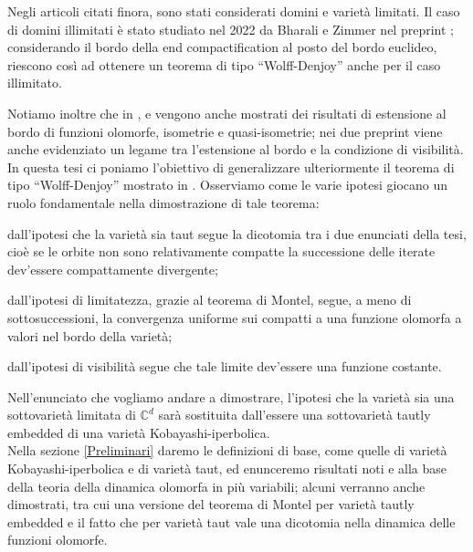 Negli articoli citati finora, sono stati considerati domini e varietà limitati. Il caso di domini illimitati è stato studiato nel 2022 da Bharali e Zimmer nel preprint \cite{BZ2}; considerando il bordo della end compactification al posto del bordo euclideo, riescono così ad ottenere un teorema di tipo ``Wolff-Denjoy'' anche per il caso illimitato.

Notiamo inoltre che in \cite{BZ1}, \cite{CMS} e \cite{BZ2} vengono anche mostrati dei risultati di estensione al bordo di funzioni olomorfe, isometrie e quasi-isometrie; nei due preprint viene anche evidenziato un legame tra l'estensione al bordo e la condizione di visibilità.\\

In questa tesi ci poniamo l'obiettivo di generalizzare ulteriormente il teorema di tipo ``Wolff-Denjoy'' mostrato in \cite{CMS}. Osserviamo come le varie ipotesi giocano un ruolo fondamentale nella dimostrazione di tale teorema:
\begin{nlist}
    \item dall'ipotesi che la varietà sia taut segue la dicotomia tra i due enunciati della tesi, cioè se le orbite non sono relativamente compatte la successione delle iterate dev'essere compattamente divergente;
    \item dall'ipotesi di limitatezza, grazie al teorema di Montel, segue, a meno di sottosuccessioni, la convergenza uniforme sui compatti a una funzione olomorfa a valori nel bordo della varietà;
    \item dall'ipotesi di visibilità segue che tale limite dev'essere una funzione costante.
\end{nlist}

Nell'enunciato che vogliamo andare a dimostrare, l'ipotesi che la varietà sia una sottovarietà limitata di $\mathbb{C}^d$ sarà sostituita dall'essere una sottovarietà tautly embedded di una varietà Kobayashi-iperbolica. \\

Nella sezione \ref{Preliminari} daremo le definizioni di base, come quelle di varietà Kobayashi-iperbolica e di varietà taut, ed enunceremo risultati noti e alla base della teoria della dinamica olomorfa in più variabili; alcuni verranno anche dimostrati, tra cui una versione del teorema di Montel per varietà tautly embedded e il fatto che per varietà taut vale una dicotomia nella dinamica delle funzioni olomorfe.

